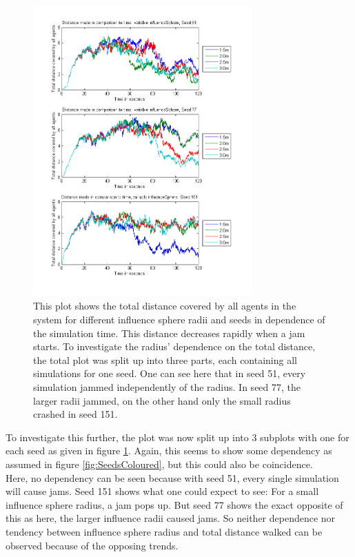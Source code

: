 \begin{figure}[h!]
	\centering
		\includegraphics[width=0.75\textwidth]{pictures/ADistancesPerSeeds.png}
	\caption{This plot shows the total distance covered by all agents in the system for different influence sphere radii and seeds in dependence of the simulation time. This distance decreases rapidly when a jam starts. To investigate the radius' dependence on the total distance, the total plot was split up into three parts, each containing all simulations for one seed. One can see here that in seed 51, every simulation jammed independently of the radius. In seed 77, the larger radii jammed, on the other hand only the small radius crashed in seed 151.}
	\label{fig:SeedsOverview}
\end{figure}

\noi To investigate this further, the plot was now split up into 3 subplots with one for each seed as given in figure \ref{fig:SeedsOverview}. Again, this seems to show some dependency as assumed in figure \ref{fig:SeedsColoured}, but this could also be coincidence.\\
Here, no dependency can be seen because with seed 51, every single simulation will cause jams. Seed 151 shows what one could expect to see: For a small influence sphere radius, a jam pops up. But seed 77 shows the exact opposite of this as here, the larger influence radii caused jams. So neither dependence nor tendency between influence sphere radius and total distance walked can be observed because of the opposing trends.\\

